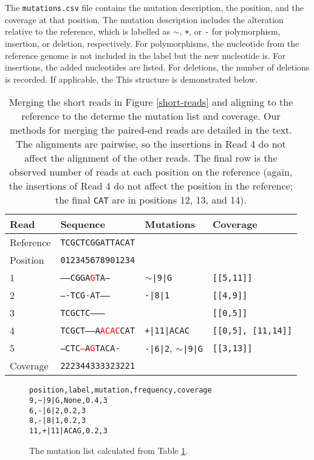 \documentclass{article}
\begin{document}
The \texttt{mutations.csv} file contains the mutation description, the position, and the coverage at that position.
The mutation description includes the alteration relative to the reference, which is labelled as \texttt{$\sim$}, \texttt{+}, or \texttt{-} for polymorphism, insertion, or deletion, respectively.
For polymorphisms, the nucleotide from the reference genome is not included in the label but the new nucleotide is.
For insertions, the added nucleotides are listed.
For deletions, the number of deletions is recorded.
If applicable, the 
This structure is demonstrated below.

\begin{table}[h!]
\begin{tabular}{llll}
Read & Sequence & Mutations & Coverage \\\hline
Reference & \texttt{TCGCTCGGATTACAT} &  &  \\
Position & \texttt{012345678901234} && \\\hline
1         & \texttt{-----CGGA\textcolor{red}{G}TA---} & \texttt{$\sim$|9|G} & \texttt{[[5,11]]}\\
2         & \texttt{----TCG\textcolor{red}{-}AT-----} & \texttt{-|8|1} & \texttt{[[4,9]]}\\
3         & \texttt{TCGCTC---------} & & \texttt{[[0,5]]}\\
4         & \texttt{TCGCT------A\textcolor{red}{ACAC}CAT} & \texttt{+|11|ACAC} & \texttt{[[0,5], [11,14]]}\\
5         & \texttt{---CTC\textcolor{red}{--}A\textcolor{red}{G}TACA-} & \texttt{-|6|2}, \texttt{$\sim$|9|G}& \texttt{[[3,13]]}\\\hline
Coverage & \texttt{222344333323221} &&
\end{tabular}
\caption{Merging the short reads in Figure \ref{short-reads} and aligning to the reference to the determe the mutation list and coverage. Our methods for merging the paired-end reads are detailed in the text. The alignments are pairwise, so the insertions in Read 4 do not affect the alignment of the other reads. The final row is the observed number of reads at each position on the reference (again, the insertions of Read 4 do not affect the position in the reference; the final \texttt{CAT} are in positions 12, 13, and 14).}
\label{aligned}
\end{table}

\begin{figure}[h!]
\begin{verbatim}
position,label,mutation,frequency,coverage
9,~|9|G,None,0.4,3
6,-|6|2,0.2,3
8,-|8|1,0.2,3
11,+|11|ACAG,0.2,3
\end{verbatim}
\caption{The mutation list calculated from Table \ref{aligned}.}
\end{figure}
\end{document}
